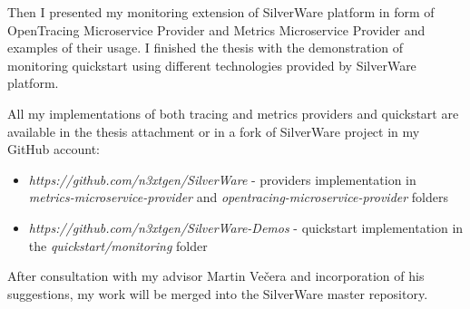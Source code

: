 \documentclass[12pt,oneside]{fithesis2}
\begin{document}
Then I presented my monitoring extension of SilverWare platform in form of OpenTracing Microservice Provider and Metrics Microservice Provider and examples of their usage. I finished the thesis with the demonstration of monitoring quickstart using different technologies provided by SilverWare platform.
 
All my implementations of both tracing and metrics providers and quickstart are available in the thesis attachment or in a fork of SilverWare project in my GitHub account:
\begin{itemize}
\item \textit{https://github.com/n3xtgen/SilverWare} - providers implementation in \textit{metrics-microservice-provider} and \textit{opentracing-microservice-provider} folders
\item \textit{https://github.com/n3xtgen/SilverWare-Demos} - quickstart implementation in the \textit{quickstart/monitoring} folder
\end{itemize}

After consultation with my advisor Martin Večera and incorporation of his suggestions, my work will be merged into the SilverWare master repository.



\end{document}
